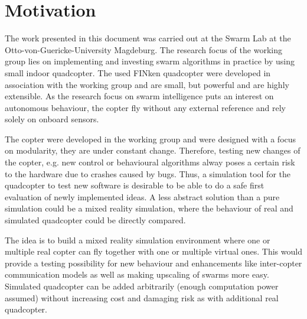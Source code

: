 

\section{Motivation}
\label{sec:motivation}
The work presented in this document was carried out at the Swarm Lab at the Otto-von-Guericke-University Magdeburg. 
The research focus of the working group lies on implementing and investing swarm algorithms in practice by using small indoor quadcopter. 
The used FINken quadcopter were developed in association with the working group and are small, but powerful and are highly extensible. 
As the research focus on swarm intelligence puts an interest on autonomous behaviour, the copter fly without any external reference and rely solely on onboard sensors.

The copter were developed in the working group and were designed with a focus on modularity, they are under constant change. 
Therefore, testing new changes of the copter, e.g. new control or behavioural algorithms alway poses a certain risk to the hardware due to crashes caused by bugs. 
Thus, a simulation tool for the quadcopter to test new software is desirable to be able to do a safe first evaluation of newly implemented ideas. 
A less abstract solution than a pure simulation could be a mixed reality simulation, where the behaviour of real and simulated quadcopter could be directly compared.

The idea is to build a mixed reality simulation environment where one or multiple real copter can fly together with one or multiple virtual ones. 
This would provide a testing possibility for new behaviour and enhancements like inter-copter communication models as well as making upscaling of swarms more easy. 
Simulated quadcopter can be added arbitrarily (enough computation power assumed) without increasing cost and damaging risk as with additional real quadcopter. 

